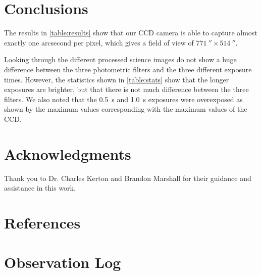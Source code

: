 \documentclass[%
aip,
jmp,
reprint,
floatfix,
nobibfootnote,
]{revtex4-1}
\begin{document}
	
	\section{Conclusions}
	
	The results in \autoref{table:results} show that our CCD camera is able to capture almost exactly one arcsecond per pixel, which gives a field of view of $\SI{771}{\arcsecond}\times\SI{514}{\arcsecond}$. 
	
	Looking through the different processed science images do not show a huge difference between the three photometric filters and the three different exposure times. However, the statistics shown in \autoref{table:stats} show that the longer exposures are brighter, but that there is not much difference between the three filters. We also noted that the \SI{0.5}{\second} and \SI{1.0}{\second} exposures were overexposed as shown by the maximum values corresponding with the maximum values of the CCD. 
	
	
	\section*{Acknowledgments}
	
	Thank you to Dr. Charles Kerton and Brandon Marshall for their guidance and assistance in this work.
	
	\section*{References}
	
%	
	
	
	
	\onecolumngrid
	\appendix
	
	\section{Observation Log}
	
	\begin{table}[H]
		\centering
		
		\label{table:log}
	\end{table}
	
\end{document}

